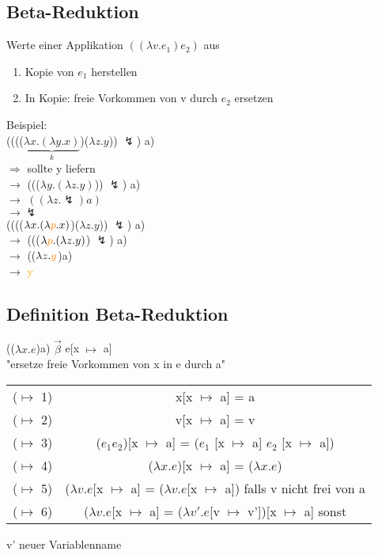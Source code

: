 \documentclass[paper=a4, fontsize=11pt]{scrartcl}
\numberwithin{equation}{section}
\numberwithin{figure}{section}
\numberwithin{table}{section}
\begin{document}
\begin{lstlistig}
\subsection{Beta-Reduktion}
Werte einer Applikation $((\lambda v.e_{1}) e_{2})$ aus 
\begin{enumerate}
\item Kopie von $e_{1}$ herstellen
\item In Kopie: freie Vorkommen von v durch $e_{2}$ ersetzen
\end{enumerate}

Beispiel: \\
(((($\underbrace{ \lambda x.(\lambda y.x)}_{k}$)($\lambda z.y$)) $\lightning$) a) \\
$\Rightarrow$ sollte y liefern \\
$\rightarrow$ ((($\lambda y.(\lambda z.y)$)) $\lightning$) a) \\
$\rightarrow$ $((\lambda z.\lightning) a)$ \\
$\rightarrow \lightning$ \\

(((($\lambda x.(\lambda \textcolor{orange}{p}.x)$)($\lambda z.y$)) $\lightning$) a) \\
$\rightarrow$ ((($\lambda \textcolor{orange}{p}. (\lambda z.y)$) $\lightning$) a) \\
$\rightarrow$ (($\lambda z.\textcolor{orange}{y}$)a)\\
$\rightarrow$ \textcolor{orange}{y} \\

\subsection{Definition Beta-Reduktion}
(($\lambda  x.e$)a) $\overrightarrow{\beta}$ e[x $\mapsto$ a] \\
"ersetze freie Vorkommen von x in e durch a" \\

\begin{tabular}{cc}
($\mapsto$ 1) & x[x $\mapsto$ a] = a \\
($\mapsto$ 2) & v[x $\mapsto$ a] = v \\
($\mapsto$ 3) & ($e_{1} e_{2}$)[x $\mapsto$ a] = ($e_{1}$ [x $\mapsto$ a] $e_{2}$ [x $\mapsto$ a]) \\
($\mapsto$ 4) & ($\lambda  x.e$)[x $\mapsto$ a] = ($\lambda  x.e$) \\
($\mapsto$ 5) & ($\lambda  v.e$[x $\mapsto$ a] = ($\lambda  v.e$[x $\mapsto$ a]) falls v nicht frei von a \\
($\mapsto$ 6) & ($\lambda  v.e$[x $\mapsto$ a] = ($\lambda v'.e$[v $\mapsto$ v'])[x $\mapsto$ a] sonst\\
\end{tabular}
v' neuer Variablenname \\


\end{lstlistig}
\end{document}
